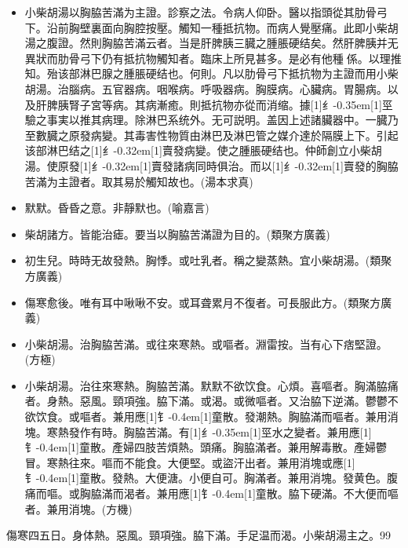 \documentclass[oneside,b4paper]{ctexbook}
\begin{document}
\begin{flushleft}
\begin{itemize}
\item 小柴胡湯以胸脇苦滿为主證。診察之法。令病人仰卧。醫以指頭從其肋骨弓下。沿前胸壁裏面向胸腔按壓。觸知一種抵抗物。而病人覺壓痛。此即小柴胡湯之腹證。然則胸脇苦滿云者。当是肝脾胰三臓之腫脹硬结矣。然肝脾胰并无異狀而肋骨弓下仍有抵抗物觸知者。臨床上所見甚多。是必有他種{𬮦}係。以理推知。殆该部淋巴腺之腫脹硬结也。何則。凡以肋骨弓下抵抗物为主證而用小柴胡湯。治腦病。五官器病。咽喉病。呼吸器病。胸膜病。心臟病。胃腸病。以及肝脾胰腎子宮等病。其病漸癒。則抵抗物亦從而消缩。據{\hbox{\scalebox{0.68}[1]{纟}\kern-0.35em\scalebox{0.64}[1]{巠}}}驗之事実以推其病理。除淋巴系统外。无可説明。盖因上述諸臟器中。一臓乃至數臓之原發病變。其毒害性物質由淋巴及淋巴管之媒介達於隔膜上下。引起该部淋巴结之{\hbox{\scalebox{0.6}[1]{纟}\kern-0.32em\scalebox{0.7}[1]{賣}}}發病變。使之腫脹硬结也。仲師創立小柴胡湯。使原發{\hbox{\scalebox{0.6}[1]{纟}\kern-0.32em\scalebox{0.7}[1]{賣}}}發諸病同時俱治。而以{\hbox{\scalebox{0.6}[1]{纟}\kern-0.32em\scalebox{0.7}[1]{賣}}}發的胸脇苦滿为主證者。取其易於觸知故也。(湯本求真)
\item 默默。昏昏之意。非靜默也。(喻嘉言)
\item 柴胡諸方。皆能治瘧。要当以胸脇苦滿證为目的。(類聚方廣義)
\item 初生兒。時時无故發熱。胸悸。或吐乳者。稱之變蒸熱。宜小柴胡湯。(類聚方廣義)
\item 傷寒愈後。唯有耳中啾啾不安。或耳聋累月不復者。可長服此方。(類聚方廣義)
\item 小柴胡湯。治胸脇苦滿。或往來寒熱。或嘔者。淵雷按。当有心下痞堅證。(方極)
\item 小柴胡湯。治往來寒熱。胸脇苦滿。默默不欲饮食。心煩。喜嘔者。胸滿脇痛者。身熱。惡風。頸項強。脇下滿。或渴。或微嘔者。又治脇下逆滿。鬱鬱不欲饮食。或嘔者。兼用應{\hbox{\scalebox{0.7}[1]{钅}\kern-0.4em\scalebox{0.7}[1]{童}}}散。發潮熱。胸脇滿而嘔者。兼用消塊。寒熱發作有時。胸脇苦滿。有{\hbox{\scalebox{0.68}[1]{纟}\kern-0.35em\scalebox{0.64}[1]{巠}}}水之變者。兼用應{\hbox{\scalebox{0.7}[1]{钅}\kern-0.4em\scalebox{0.7}[1]{童}}}散。產婦四肢苦煩熱。頭痛。胸脇滿者。兼用解毒散。產婦鬱冒。寒熱往來。嘔而不能食。大便堅。或盜汗出者。兼用消塊或應{\hbox{\scalebox{0.7}[1]{钅}\kern-0.4em\scalebox{0.7}[1]{童}}}散。發熱。大便溏。小便自可。胸滿者。兼用消塊。發黄色。腹痛而嘔。或胸脇滿而渴者。兼用應{\hbox{\scalebox{0.7}[1]{钅}\kern-0.4em\scalebox{0.7}[1]{童}}}散。脇下硬滿。不大便而嘔者。兼用消塊。(方機)
\end{itemize}

傷寒四五日。身体熱。惡風。頸項強。脇下滿。手足温而渴。小柴胡湯主之。99


\end{flushleft}
\end{document}
